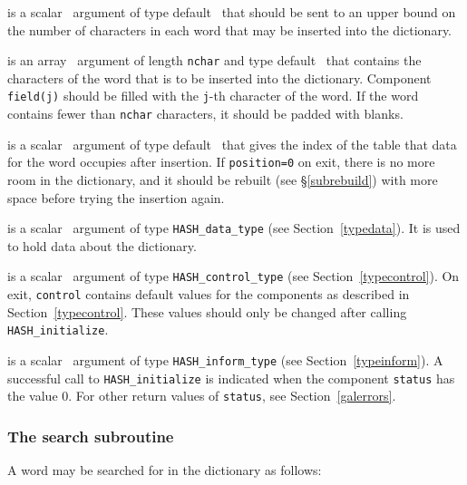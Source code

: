 \documentclass{galahad}
\newcommand{\packagename}{HASH}
\begin{document}
\vspace*{-2mm}
\begin{description}

 is a scalar \intentin\ argument of type default \integer\ that
should be sent to an upper bound on the number of characters in each
word that may be inserted into the dictionary.

 is an array \intentin\ argument of length {\tt nchar} and 
type default \character\ that contains the characters of the word that 
is to be inserted into the dictionary.  
Component {\tt field(j)} should be filled with the {\tt j}-th 
character of the word. If the word contains fewer than {\tt nchar} characters,
it should be padded with blanks.

 is a scalar \intentout\ argument of type default \integer\ that
gives the index of the table that data for the word occupies after insertion.
If {\tt position=0} on exit, there is no more room in the dictionary, and
it should be rebuilt (see \S\ref{subrebuild}) with more space before trying 
the insertion again.

 is a scalar \intentinout\ argument of type
{\tt \packagename\_data\_type}
(see Section~\ref{typedata}). It is used to hold data about the dictionary.

 is a scalar \intentin\ argument of type
{\tt \packagename\_control\_type}
(see Section~\ref{typecontrol}).
On exit, {\tt control} contains default values for the components as
described in Section~\ref{typecontrol}.
These values should only be changed after calling
{\tt \packagename\_initialize}.

 is a scalar \intentinout\ argument of type
{\tt \packagename\_inform\_type}
(see Section~\ref{typeinform}). A successful call to
{\tt \packagename\_initialize}
is indicated when the  component {\tt status} has the value 0.
For other return values of {\tt status}, see Section~\ref{galerrors}.

\end{description}


\subsubsection{The search subroutine}\label{subsearch}
A word may be searched for in the dictionary as follows:
\vspace*{1mm}
\end{document}
